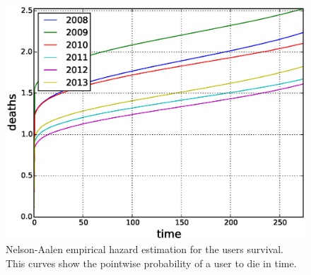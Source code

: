 \begin{figure}[!tb]
\centering
\includegraphics[scale=0.4]{./images/nelson_aalen_users.eps}
\caption{Nelson-Aalen empirical hazard estimation for the users survival. This curves show the pointwise probability of a user to die in time.}
\label{fig:nelson_aalen_users}
\end{figure}
